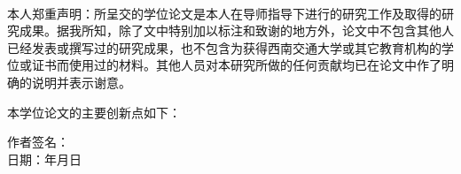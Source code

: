 \clearpagebyprint
\begin{center}
	\textbf{}
	\\
	\textbf{}
\end{center}

\vspace{5mm plus 2mm minus 2mm}
\linespread{1.75}\selectfont
本人郑重声明：所呈交的学位论文是本人在导师指导下进行的研究工作及取得的研究成果。据我所知，除了文中特别加以标注和致谢的地方外，论文中不包含其他人已经发表或撰写过的研究成果，也不包含为获得西南交通大学或其它教育机构的学位或证书而使用过的材料。其他人员对本研究所做的任何贡献均已在论文中作了明确的说明并表示谢意。\par

本学位论文的主要创新点如下：\par
  




\vspace{60mm plus 50mm minus 50mm}

\begin{flushright}
	作者签名：\fillinblank{10em}{}
	\\
	\vspace{7mm}
	日期：\qquad 年\qquad 月\qquad 日
\end{flushright}
\vfill